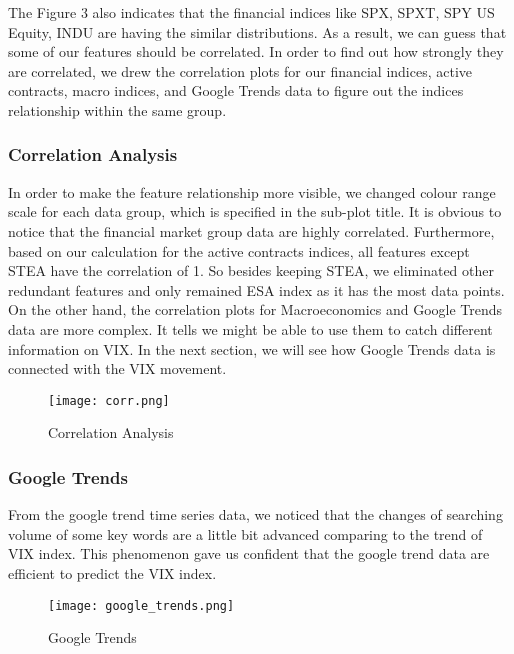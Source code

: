 \documentclass[fleqn,10pt]{SelfArx} %
\begin{document}
\noindent
The Figure 3 also indicates that the financial indices like SPX, SPXT, SPY US Equity, INDU are having the similar distributions. As a result, we can guess that some of our features should be correlated. In order to find out how strongly they are correlated, we drew the correlation plots for our financial indices, active contracts, macro indices, and Google Trends data to figure out the indices relationship within the same group.

\subsubsection*{Correlation Analysis}
In order to make the feature relationship more visible, we changed colour range scale for each data group, which is specified in the sub-plot title. It is obvious to notice that the financial market group data are highly correlated. Furthermore, based on our calculation for the active contracts indices, all features except STEA have the correlation of 1. So besides keeping STEA, we eliminated other redundant features and only remained ESA index as it has the most data points. On the other hand, the correlation plots for Macroeconomics and Google Trends data are more complex. It tells we might be able to use them to catch different information on VIX. In the next section, we will see how Google Trends data is connected with the VIX movement. 

\begin{figure}[h]\centering %
\texttt{[image: corr.png]}
\caption{Correlation Analysis}
\label{fig:view}
\end{figure}

\subsubsection*{Google Trends}
\noindent
From the google trend time series data, we noticed that the changes of searching volume of some key words are a little bit advanced comparing to the trend of VIX index. This phenomenon gave us confident that the google trend data are efficient to predict the VIX index.

\begin{figure}[h]\centering %
\texttt{[image: google\_trends.png]}
\caption{Google Trends}
\label{fig:view}
\end{figure}
\end{document}
